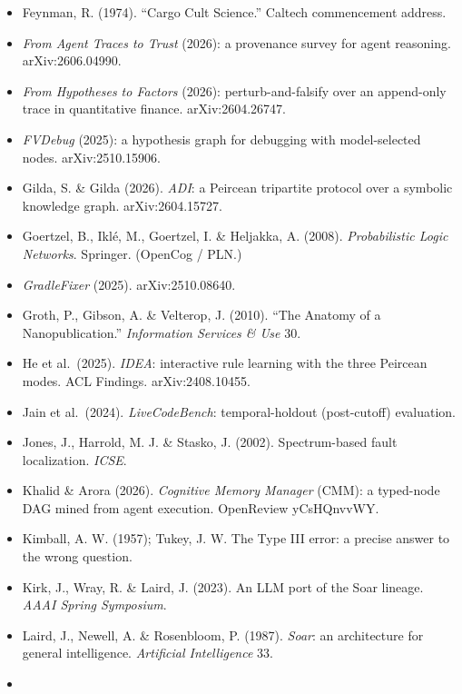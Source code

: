 \documentclass[
  10pt,
]{article}
\begin{document}
\begin{itemize}
  Dung, P. M. (1995). ``On the acceptability of arguments and its
  fundamental role in nonmonotonic reasoning, logic programming and
  n-person games.'' \emph{Artificial Intelligence} 77. (Abstract
  argumentation frameworks.)
\item
  Feynman, R. (1974). ``Cargo Cult Science.'' Caltech commencement
  address.
\item
  \emph{From Agent Traces to Trust} (2026): a provenance survey for
  agent reasoning. arXiv:2606.04990.
\item
  \emph{From Hypotheses to Factors} (2026): perturb-and-falsify over an
  append-only trace in quantitative finance. arXiv:2604.26747.
\item
  \emph{FVDebug} (2025): a hypothesis graph for debugging with
  model-selected nodes. arXiv:2510.15906.
\item
  Gilda, S. \& Gilda (2026). \emph{ADI}: a Peircean tripartite protocol
  over a symbolic knowledge graph. arXiv:2604.15727.
\item
  Goertzel, B., Iklé, M., Goertzel, I. \& Heljakka, A. (2008).
  \emph{Probabilistic Logic Networks}. Springer. (OpenCog / PLN.)
\item
  \emph{GradleFixer} (2025). arXiv:2510.08640.
\item
  Groth, P., Gibson, A. \& Velterop, J. (2010). ``The Anatomy of a
  Nanopublication.'' \emph{Information Services \& Use} 30.
\item
  He et al.~(2025). \emph{IDEA}: interactive rule learning with the
  three Peircean modes. ACL Findings. arXiv:2408.10455.
\item
  Jain et al.~(2024). \emph{LiveCodeBench}: temporal-holdout
  (post-cutoff) evaluation.
\item
  Jones, J., Harrold, M. J. \& Stasko, J. (2002). Spectrum-based fault
  localization. \emph{ICSE}.
\item
  Khalid \& Arora (2026). \emph{Cognitive Memory Manager} (CMM): a
  typed-node DAG mined from agent execution. OpenReview yCsHQnvvWY.
\item
  Kimball, A. W. (1957); Tukey, J. W. The Type III error: a precise
  answer to the wrong question.
\item
  Kirk, J., Wray, R. \& Laird, J. (2023). An LLM port of the Soar
  lineage. \emph{AAAI Spring Symposium}.
\item
  Laird, J., Newell, A. \& Rosenbloom, P. (1987). \emph{Soar}: an
  architecture for general intelligence. \emph{Artificial Intelligence}
  33.
\item

\end{itemize}
\end{document}
